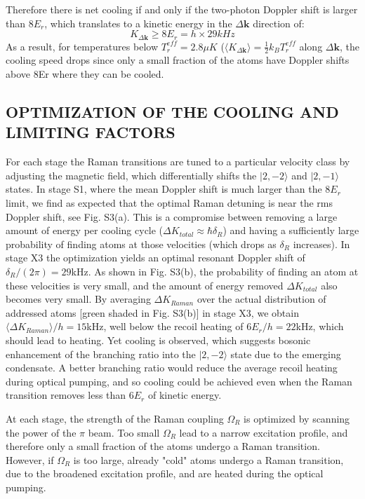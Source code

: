 \documentclass{article}
\begin{document}
Therefore there is net cooling if and only if the two-photon Doppler shift is larger than $8E_r$, which translates to a kinetic energy in the $\Delta \mathbf{k}$ direction of:
\begin{equation}
    K_{\Delta \mathbf{k}} \geq 8 E_r = h \times 29 kHz
\end{equation}
As a result, for temperatures below $T^{eff}_r = 2.8 \mu K$ ($\langle K_{\Delta \mathbf{k}} \rangle = \frac{1}{2} k_B T^{eff}_r$ along $\Delta \mathbf{k}$, the cooling speed drops since only a small fraction of the atoms have Doppler shifts above 8Er where they can be cooled.

\subsection{OPTIMIZATION OF THE COOLING AND LIMITING FACTORS}
For each stage the Raman transitions are tuned to a particular velocity class by adjusting the magnetic field, which differentially shifts the $\vert 2, -2 \rangle$ and $\vert 2, -1 \rangle$ states. In stage S1, where the mean Doppler shift is much larger than the $8E_r$ limit, we find as expected that the optimal Raman detuning is near the rms Doppler shift, see Fig. S3(a). This is a compromise between removing a large amount of energy per cooling cycle ($\Delta K_{total} \approx \hbar \delta_R$) and having a sufficiently large probability of finding atoms at those velocities (which drops as $\delta_R$ increases). In stage X3 the optimization yields an optimal resonant Doppler shift of $\delta_R/(2 \pi) = 29$kHz. As shown in Fig. S3(b), the probability of finding an atom at these velocities is very small, and the amount of energy removed $\Delta K_{total}$ also becomes very small. By averaging $\Delta K_{Raman}$ over the actual distribution of addressed atoms [green shaded in Fig. S3(b)] in stage X3, we obtain $\langle \Delta K_{Raman} \rangle / h = 15$kHz, well below the recoil heating of $6E_r/h = 22$kHz, which should lead to heating. Yet cooling is observed, which suggests bosonic enhancement of the branching ratio into the $\vert2, -2\rangle$ state due to the emerging condensate. A better branching ratio would reduce the average recoil heating during optical pumping, and so cooling could be achieved even when the Raman transition removes less than $6E_r$ of kinetic energy.

At each stage, the strength of the Raman coupling $\Omega_R$ is optimized by scanning the power of the $\pi$ beam. Too small $\Omega_R$ lead to a narrow excitation profile, and therefore only a small fraction of the atoms undergo a Raman transition. However, if $\Omega_R$ is too large, already "cold" atoms undergo a Raman transition, due to the broadened excitation profile, and are heated during the optical pumping.
\end{document}
